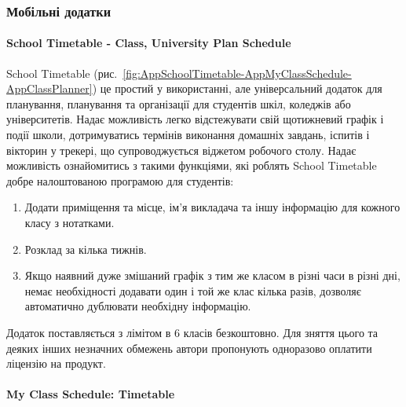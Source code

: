 \subsubsection{Мобільні додатки}

\paragraph{School Timetable - Class, University Plan Schedule}



School Timetable (рис.~\ref{fig:AppSchoolTimetable-AppMyClassSchedule-AppClassPlanner}) це простий у використанні, але універсальний додаток для планування, планування та організації для студентів шкіл, коледжів або університетів. Надає можливість легко відстежувати свій щотижневий графік і події школи, дотримуватись термінів виконання домашніх завдань, іспитів і вікторин у трекері, що супроводжується віджетом робочого столу. Надає можливість ознайомитись з такими функціями, які роблять School Timetable добре налоштованою програмою для студентів:

\begin{enumerate}
    \item Додати приміщення та місце, ім'я викладача та іншу інформацію для кожного класу з нотатками.
    \item Розклад за кілька тижнів.
    \item Якщо наявний дуже змішаний графік з тим же класом в різні часи в різні дні, немає необхідності додавати один і той же клас кілька разів, дозволяє автоматично дублювати необхідну інформацію.
\end{enumerate}

Додаток поставляється з лімітом в 6 класів безкоштовно. Для зняття цього та деяких інших незначних обмежень автори пропонують одноразово оплатити ліцензію на продукт.

\paragraph{My Class Schedule: Timetable}

